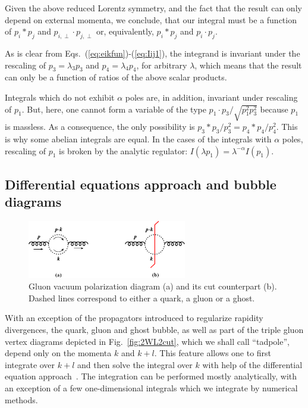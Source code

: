 \documentclass[a4paper,11pt]{article}
\numberwithin{equation}{section}
\begin{document}
Given the above reduced Lorentz symmetry, and the fact that the result can
only depend on external momenta, we conclude, that our integral must be a
function of $p_i * p_j$ and $p_{i,\perp} \cdot p_{j,\perp}$ or, equivalently,
$p_i * p_j$ and $p_i \cdot p_j$.

As is clear from Eqs.~(\ref{eq:eikfun})-(\ref{eq:Iij1}), the integrand is
invariant under the rescaling of $p_3 = \lambda_3 p_3$ and $p_4 = \lambda_4
p_4$, for arbitrary $\lambda$, which means that the result can only be a
function of ratios of the above scalar products.

Integrals which do not exhibit $\alpha$ poles are, in addition, invariant under
rescaling of $p_1$. But, here, one cannot form a variable of the type $p_1
\cdot p_3/\sqrt{p_1^2 p_3^2}$ because $p_1$ is massless. As a consequence, the
only possibility is $p_3*p_3/p_3^2 = p_4*p_4/p_4^2 $. 
This is why some abelian integrals are equal. 
%
In the cases of the integrals with $\alpha$ poles, rescaling of $p_1$ is broken
by the analytic regulator: $I(\lambda p_1) =  \lambda^{-\alpha} I(p_1)$.


\subsection{Differential equations approach and bubble diagrams}
\label{sec:debubble}

\begin{figure}[t]
  \begin{center}
    \includegraphics[width=0.62\textwidth]{plots/vp-diagram.png}
  \end{center}
  \caption{
  Gluon vacuum polarization diagram (a) and its cut counterpart (b).
  Dashed lines correspond to either a quark, a gluon or a ghost.
  }
  \label{fig:vp-diagram}
\end{figure}

With an exception of the propagators introduced to regularize rapidity
divergences, the quark, gluon and ghost bubble, as well as part of the triple
gluon vertex diagrams depicted in Fig.~\ref{fig:2WL2cut}, which we shall call
``tadpole'', depend only on the
momenta $k$ and $k+l$.
%
This feature allows one to first integrate over $k+l$ and then solve the
integral over $k$ with help of the differential equation 
approach~\cite{Kotikov:1990kg, Remiddi:1997ny}. The integration
can be performed mostly analytically, with an exception of a few one-dimensional
integrals which we integrate by numerical methods.
\end{document}
